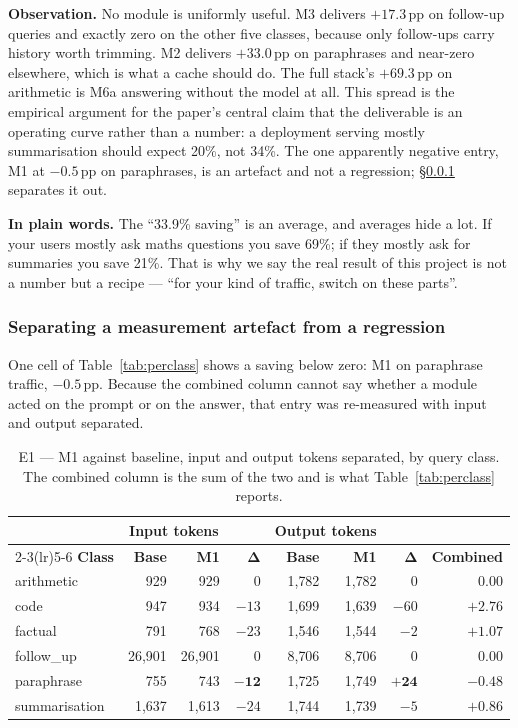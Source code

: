 \documentclass[11pt,a4paper]{article}
\newcommand{\obs}[1]{%
  \par\vspace{2pt}
  \noindent\begin{tcolorbox}[colback=soft,colframe=accent,boxrule=0pt,
    leftrule=2.2pt,arc=0pt,left=7pt,right=5pt,top=4pt,bottom=4pt,breakable]
  \small\textbf{Observation.} #1
  \end{tcolorbox}\par\vspace{2pt}}
\newcommand{\plain}[1]{%
  \par\vspace{1pt}
  \noindent\begin{tcolorbox}[colback=plainblue,colframe=plainrule,boxrule=0pt,
    leftrule=2.2pt,arc=0pt,left=7pt,right=5pt,top=4pt,bottom=4pt,breakable]
  \small\textbf{In plain words.} #1
  \end{tcolorbox}\par\vspace{2pt}}
\begin{document}
\obs{No module is uniformly useful. M3 delivers $+17.3$\,pp on follow-up queries
and exactly zero on the other five classes, because only follow-ups carry history
worth trimming. M2 delivers $+33.0$\,pp on paraphrases and near-zero elsewhere,
which is what a cache should do. The full stack's $+69.3$\,pp on arithmetic is
M6a answering without the model at all. This spread is the empirical argument for
the paper's central claim that the deliverable is an operating curve rather than
a number: a deployment serving mostly summarisation should expect 20\%, not 34\%.
The one apparently negative entry, M1 at $-0.5$\,pp on paraphrases, is an
artefact and not a regression; §\ref{sec:artefact} separates it out.}

\plain{The ``33.9\% saving'' is an average, and averages hide a lot. If your
users mostly ask maths questions you save 69\%; if they mostly ask for summaries
you save 21\%. That is why we say the real result of this project is not a number
but a recipe --- ``for your kind of traffic, switch on these parts''.}

\subsubsection{Separating a measurement artefact from a regression}
\label{sec:artefact}

One cell of Table~\ref{tab:perclass} shows a saving below zero: M1 on paraphrase
traffic, $-0.5$\,pp. Because the combined column cannot say whether a module
acted on the prompt or on the answer, that entry was re-measured with input and
output separated.

\begin{table}[htbp]
\centering
\caption{E1 --- M1 against baseline, input and output tokens separated, by query
class. The combined column is the sum of the two and is what
Table~\ref{tab:perclass} reports.}
\label{tab:m1split}
\footnotesize
\begin{tabular}{@{}l rr r rr r r@{}}
\toprule
& \multicolumn{2}{c}{\textbf{Input tokens}} & &
  \multicolumn{2}{c}{\textbf{Output tokens}} & & \\
\cmidrule(lr){2-3}\cmidrule(lr){5-6}
\textbf{Class} & \textbf{Base} & \textbf{M1} & $\boldsymbol{\Delta}$ &
\textbf{Base} & \textbf{M1} & $\boldsymbol{\Delta}$ & \textbf{Combined} \\
\midrule
arithmetic    &   929 &   929 & \phantom{$-$}0 & 1{,}782 & 1{,}782 & \phantom{$-$}0 & \phantom{$+$}0.00 \\
code          &   947 &   934 & $-13$ & 1{,}699 & 1{,}639 & $-60$ & $+2.76$ \\
factual       &   791 &   768 & $-23$ & 1{,}546 & 1{,}544 & $-2$  & $+1.07$ \\
follow\_up    & 26{,}901 & 26{,}901 & \phantom{$-$}0 & 8{,}706 & 8{,}706 & \phantom{$-$}0 & \phantom{$+$}0.00 \\
paraphrase    &   755 &   743 & $\mathbf{-12}$ & 1{,}725 & 1{,}749 & $\mathbf{+24}$ & $\mathbf{-0.48}$ \\
summarisation & 1{,}637 & 1{,}613 & $-24$ & 1{,}744 & 1{,}739 & $-5$  & $+0.86$ \\
\bottomrule
\end{tabular}
\end{table}
\end{document}
